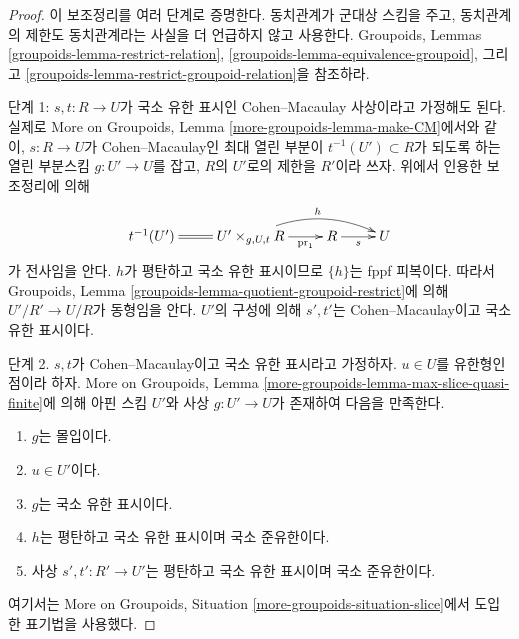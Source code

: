 \begin{proof}
이 보조정리를 여러 단계로 증명한다. 동치관계가 군대상 스킴을 주고,
동치관계의 제한도 동치관계라는 사실을 더 언급하지 않고 사용한다.
Groupoids, Lemmas
\ref{groupoids-lemma-restrict-relation},
\ref{groupoids-lemma-equivalence-groupoid}, 그리고
\ref{groupoids-lemma-restrict-groupoid-relation}을 참조하라.

\medskip\noindent
단계 1: $s, t : R \to U$가 국소 유한 표시인 Cohen--Macaulay 사상이라고
가정해도 된다. 실제로 More on Groupoids, Lemma
\ref{more-groupoids-lemma-make-CM}에서와 같이, $s : R \to U$가
Cohen--Macaulay인 최대 열린 부분이 $t^{-1}(U') \subset R$가 되도록 하는
열린 부분스킴 $g : U' \to U$를 잡고, $R$의 $U'$로의 제한을 $R'$이라
쓰자.
위에서 인용한 보조정리에 의해
$$
\xymatrix{
t^{-1}(U') \ar@{=}[r] &
U' \times_{g, U, t} R \ar[r]_-{\text{pr}_1} \ar@/^3ex/[rr]^h &
R \ar[r]_s &
U
}
$$
가 전사임을 안다. $h$가 평탄하고 국소 유한 표시이므로 $\{h\}$는
fppf 피복이다. 따라서 Groupoids, Lemma
\ref{groupoids-lemma-quotient-groupoid-restrict}에 의해
$U'/R' \to U/R$가 동형임을 안다. $U'$의 구성에 의해 $s', t'$는
Cohen--Macaulay이고 국소 유한 표시이다.

\medskip\noindent
단계 2. $s, t$가 Cohen--Macaulay이고 국소 유한 표시라고 가정하자.
$u \in U$를 유한형인 점이라 하자. More on Groupoids, Lemma
\ref{more-groupoids-lemma-max-slice-quasi-finite}에 의해 아핀 스킴 $U'$와
사상 $g : U' \to U$가 존재하여 다음을 만족한다.
\begin{enumerate}
\item $g$는 몰입이다.
\item $u \in U'$이다.
\item $g$는 국소 유한 표시이다.
\item $h$는 평탄하고 국소 유한 표시이며 국소 준유한이다.
\item 사상 $s', t' : R' \to U'$는 평탄하고 국소 유한 표시이며 국소
준유한이다.
\end{enumerate}
여기서는 More on Groupoids, Situation
\ref{more-groupoids-situation-slice}에서 도입한 표기법을 사용했다.


\end{proof}
